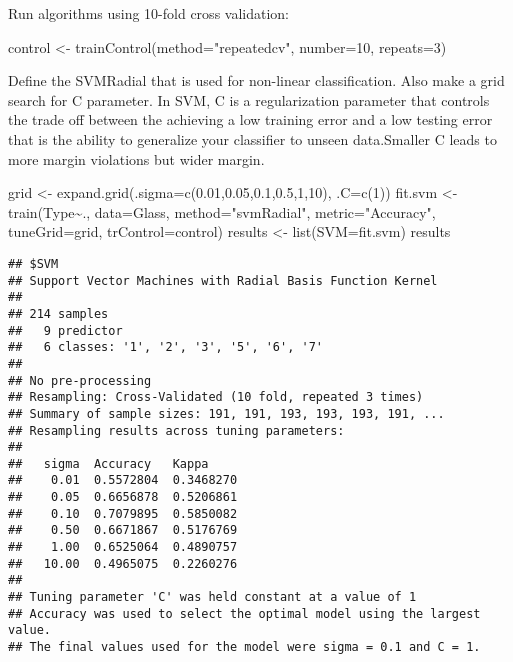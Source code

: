 \documentclass[
]{article}
\newenvironment{Shaded}{\begin{snugshade}}{\end{snugshade}}
\newcommand{\AttributeTok}[1]{\textcolor[rgb]{0.77,0.63,0.00}{#1}}
\newcommand{\DecValTok}[1]{\textcolor[rgb]{0.00,0.00,0.81}{#1}}
\newcommand{\FloatTok}[1]{\textcolor[rgb]{0.00,0.00,0.81}{#1}}
\newcommand{\FunctionTok}[1]{\textcolor[rgb]{0.00,0.00,0.00}{#1}}
\newcommand{\NormalTok}[1]{#1}
\newcommand{\OtherTok}[1]{\textcolor[rgb]{0.56,0.35,0.01}{#1}}
\newcommand{\SpecialCharTok}[1]{\textcolor[rgb]{0.00,0.00,0.00}{#1}}
\newcommand{\StringTok}[1]{\textcolor[rgb]{0.31,0.60,0.02}{#1}}
\begin{document}
Run algorithms using 10-fold cross validation:

\begin{Shaded}
\begin{Highlighting}[]
\NormalTok{control }\OtherTok{\textless{}{-}} \FunctionTok{trainControl}\NormalTok{(}\AttributeTok{method=}\StringTok{"repeatedcv"}\NormalTok{, }\AttributeTok{number=}\DecValTok{10}\NormalTok{, }\AttributeTok{repeats=}\DecValTok{3}\NormalTok{)}
\end{Highlighting}
\end{Shaded}

Define the SVMRadial that is used for non-linear classification. Also
make a grid search for C parameter. In SVM, C is a regularization
parameter that controls the trade off between the achieving a low
training error and a low testing error that is the ability to generalize
your classifier to unseen data.Smaller C leads to more margin violations
but wider margin.

\begin{Shaded}
\begin{Highlighting}[]
\NormalTok{grid }\OtherTok{\textless{}{-}} \FunctionTok{expand.grid}\NormalTok{(}\AttributeTok{.sigma=}\FunctionTok{c}\NormalTok{(}\FloatTok{0.01}\NormalTok{,}\FloatTok{0.05}\NormalTok{,}\FloatTok{0.1}\NormalTok{,}\FloatTok{0.5}\NormalTok{,}\DecValTok{1}\NormalTok{,}\DecValTok{10}\NormalTok{), }\AttributeTok{.C=}\FunctionTok{c}\NormalTok{(}\DecValTok{1}\NormalTok{))}
\NormalTok{fit.svm }\OtherTok{\textless{}{-}} \FunctionTok{train}\NormalTok{(Type}\SpecialCharTok{\textasciitilde{}}\NormalTok{., }\AttributeTok{data=}\NormalTok{Glass, }\AttributeTok{method=}\StringTok{"svmRadial"}\NormalTok{, }
                 \AttributeTok{metric=}\StringTok{"Accuracy"}\NormalTok{, }\AttributeTok{tuneGrid=}\NormalTok{grid, }
                 \AttributeTok{trControl=}\NormalTok{control)}
\NormalTok{results }\OtherTok{\textless{}{-}} \FunctionTok{list}\NormalTok{(}\AttributeTok{SVM=}\NormalTok{fit.svm)}
\NormalTok{results}
\end{Highlighting}
\end{Shaded}

\begin{verbatim}
## $SVM
## Support Vector Machines with Radial Basis Function Kernel 
## 
## 214 samples
##   9 predictor
##   6 classes: '1', '2', '3', '5', '6', '7' 
## 
## No pre-processing
## Resampling: Cross-Validated (10 fold, repeated 3 times) 
## Summary of sample sizes: 191, 191, 193, 193, 193, 191, ... 
## Resampling results across tuning parameters:
## 
##   sigma  Accuracy   Kappa    
##    0.01  0.5572804  0.3468270
##    0.05  0.6656878  0.5206861
##    0.10  0.7079895  0.5850082
##    0.50  0.6671867  0.5176769
##    1.00  0.6525064  0.4890757
##   10.00  0.4965075  0.2260276
## 
## Tuning parameter 'C' was held constant at a value of 1
## Accuracy was used to select the optimal model using the largest value.
## The final values used for the model were sigma = 0.1 and C = 1.
\end{verbatim}
\end{document}
